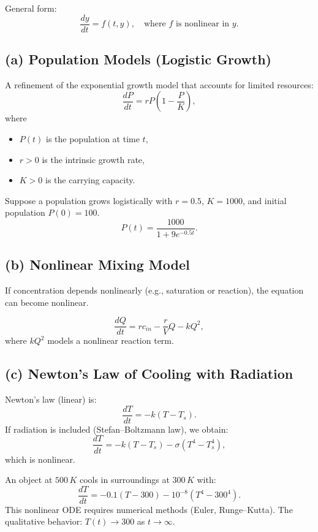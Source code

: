   General form:
  \[
  \frac{dy}{dt} = f(t, y), \quad \text{where $f$ is nonlinear in $y$.}
  \]

\subsection*{(a) Population Models (Logistic Growth)}
  A refinement of the exponential growth model that accounts for limited resources:
  \[
  \frac{dP}{dt} = rP\left(1 - \frac{P}{K}\right),
  \]
  where 
  \begin{itemize}
      \item $P(t)$ is the population at time $t$,
      \item $r > 0$ is the intrinsic growth rate,
      \item $K > 0$ is the carrying capacity.
  \end{itemize}

  \begin{example}
    Suppose a population grows logistically with $r=0.5$, $K=1000$, and initial population $P(0)=100$.  
    \[
    P(t) = \frac{1000}{1 + 9e^{-0.5t}}.
    \]
  \end{example}


  \subsection*{(b) Nonlinear Mixing Model}
  If concentration depends nonlinearly (e.g., saturation or reaction), the equation can become nonlinear.  

  \begin{example}
     \[
    \frac{dQ}{dt} = r c_{in} - \frac{r}{V}Q - kQ^2,
    \]
    where $kQ^2$ models a nonlinear reaction term.
  \end{example}


  \subsection*{(c) Newton’s Law of Cooling with Radiation}
    Newton’s law (linear) is:
    \[
    \frac{dT}{dt} = -k(T - T_s).
    \]
    If radiation is included (Stefan–Boltzmann law), we obtain:
    \[
    \frac{dT}{dt} = -k(T - T_s) - \sigma (T^4 - T_s^4),
    \]
    which is nonlinear.


    \begin{example}
      An object at $500\,K$ cools in surroundings at $300\,K$ with:
      \[
      \frac{dT}{dt} = -0.1(T-300) - 10^{-8}(T^4 - 300^4).
      \]
      This nonlinear ODE requires numerical methods (Euler, Runge–Kutta). The qualitative behavior: $T(t)\to 300$ as $t\to\infty$.
    \end{example}
    

